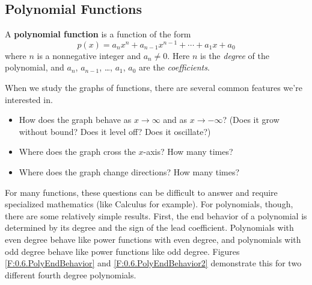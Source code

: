 

\subsection*{Polynomial Functions} 

\begin{definition}
A {\bf polynomial function} is a function of the form
	\[
		p(x)=a_{n}x^{n} + a_{n-1}x^{n-1}+\cdots + a_{1}x + a_{0}
	\]
where $n$ is a nonnegative integer and $a_{n}\ne 0$.  Here $n$ is the {\it degree} of the
polynomial, and $a_{n}$, $a_{n-1}$, \ldots, $a_{1}$, $a_{0}$ are the {\it coefficients}.
\end{definition}

When we study the graphs of functions, there are several common features we're interested in.  
\begin{itemize}
	\item How does the graph behave as $x\to\infty$ and as $x\to-\infty$? (Does it grow without bound? Does it level off? Does it oscillate?) 
	\item Where does the graph cross the $x$-axis? How many times? 
	\item Where does the graph change directions? How many times?
\end{itemize}

For many functions, these questions can be difficult to answer and require specialized
mathematics (like Calculus for example).  For polynomials, though, there are some
relatively simple results.  First, the end behavior of a polynomial is determined by its
degree and the sign of the lead coefficient.  Polynomials with even degree behave like
power functions with even degree, and polynomials with odd degree behave like power
functions like odd degree. Figures \ref{F:0.6.PolyEndBehavior} and
\ref{F:0.6.PolyEndBehavior2} demonstrate this for two different fourth degree polynomials.


